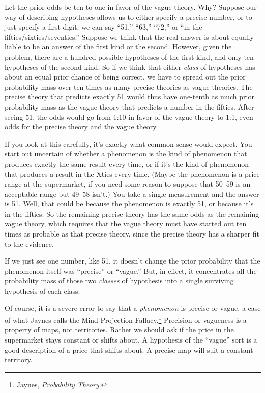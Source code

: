 {
 Let the prior odds be ten to one in favor of the vague theory.
Why? Suppose our way of describing hypotheses allows us to either
specify a precise number, or to just specify a first-digit; we can say
``51,''
``63,''
``72,'' or ``in the
fifties/sixties/seventies.'' Suppose we think that
the real answer is about equally liable to be an answer of the first
kind or the second. However, given the problem, there are a hundred
possible hypotheses of the first kind, and only ten hypotheses of the
second kind. So if we think that either \textit{class} of hypotheses
has about an equal prior chance of being correct, we have to spread out
the prior probability mass over ten times as many precise theories as
vague theories. The precise theory that predicts exactly 51 would thus
have one-tenth as much prior probability mass as the vague theory that
predicts a number in the fifties. After seeing 51, the odds would go
from 1:10 in favor of the vague theory to 1:1, even odds for the
precise theory and the vague theory.}

{
 If you look at this carefully, it's exactly what
common sense would expect. You start out uncertain of whether a
phenomenon is the kind of phenomenon that produces exactly the same
result every time, or if it's the kind of phenomenon
that produces a result in the Xties every time. (Maybe the phenomenon
is a price range at the supermarket, if you need some reason to suppose
that 50--59 is an acceptable range but 49--58 isn't.)
You take a single measurement and the answer is 51. Well, that could be
because the phenomenon is exactly 51, or because it's
in the fifties. So the remaining precise theory has the same odds as
the remaining vague theory, which requires that the vague theory must
have started out ten times as probable as that precise theory, since
the precise theory has a sharper fit to the evidence.}

{
 If we just see one number, like 51, it doesn't
change the prior probability that the phenomenon itself was
``precise'' or
``vague.'' But, in effect, it
concentrates all the probability mass of those two \textit{classes} of
hypothesis into a single surviving hypothesis of each class.}

{
 Of course, it is a severe error to say that a \textit{phenomenon}
is precise or vague, a case of what Jaynes calls the Mind Projection
Fallacy.\footnote{Jaynes, \textit{Probability Theory}.} Precision or vagueness is a property of
maps, not territories. Rather we should ask if the price in the
supermarket stays constant or shifts about. A hypothesis of the
``vague'' sort is a good description
of a price that shifts about. A precise map will suit a constant
territory.}

